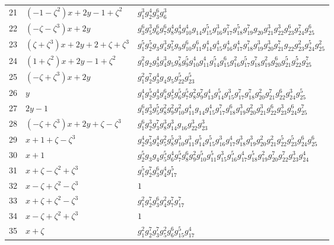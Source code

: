 \documentclass[11pt]{article}
\begin{document}
{\begin{longtable}{@{}rll@{}}
21 & $(-1-\zeta^2)x+2 y-1+\zeta^2$ & $g_{1}^{3}g_{2}^{4}g_{3}^{6}g_{6}^{3}$\\
22 & $(-\zeta-\zeta^3)x+2 y$ & $g_{3}^{6}g_{5}^{3}g_{6}^{6}g_{7}^{6}g_{8}^{4}g_{9}^{4}g_{10}^{4}g_{14}g_{15}^{5}g_{16}^{3}g_{17}^{7}g_{18}^{5}g_{19}^{7}g_{20}g_{21}^{3}g_{22}^{3}g_{23}^{6}g_{24}^{7}g_{25}^{6}$\\
23 & $(\zeta+\zeta^3)x+2 y+2+\zeta+\zeta^3$ & $g_{1}^{5}g_{2}^{5}g_{3}g_{4}^{3}g_{5}^{7}g_{9}g_{10}^{6}g_{11}^{6}g_{14}^{4}g_{15}^{4}g_{16}^{4}g_{17}^{4}g_{18}^{7}g_{19}^{3}g_{20}^{3}g_{21}^{7}g_{22}g_{23}^{2}g_{24}^{5}g_{25}^{2}$\\
24 & $(1+\zeta^2)x+2 y-1+\zeta^2$ & $g_{1}^{2}g_{2}g_{3}^{4}g_{4}^{3}g_{5}g_{8}^{7}g_{9}^{5}g_{10}^{4}g_{11}^{4}g_{14}^{5}g_{15}^{6}g_{16}^{2}g_{17}^{5}g_{18}^{7}g_{19}^{2}g_{20}^{6}g_{21}^{5}g_{22}^{5}g_{25}^{7}$\\
25 & $(-\zeta+\zeta^3)x+2 y$ & $g_{1}^{2}g_{2}^{7}g_{3}^{4}g_{4}g_{5}g_{22}^{5}g_{23}^{5}$\\
26 & $y$ & $g_{1}^{4}g_{2}^{5}g_{3}^{4}g_{4}^{6}g_{5}^{4}g_{6}^{5}g_{7}^{5}g_{8}^{2}g_{9}^{7}g_{13}^{4}g_{14}^{5}g_{15}^{3}g_{17}^{7}g_{18}^{7}g_{20}^{2}g_{21}^{7}g_{22}^{6}g_{24}^{3}g_{25}^{5}$\\
27 & $2 y-1$ & $g_{1}^{6}g_{3}^{3}g_{5}^{5}g_{8}^{2}g_{9}^{2}g_{10}^{2}g_{11}^{4}g_{14}g_{15}^{4}g_{17}^{7}g_{18}^{6}g_{19}^{3}g_{20}^{2}g_{21}^{3}g_{22}^{6}g_{23}^{3}g_{24}^{6}g_{25}^{7}$\\
28 & $(-\zeta+\zeta^3)x+2 y+\zeta-\zeta^3$ & $g_{1}^{6}g_{2}^{3}g_{3}^{7}g_{8}^{3}g_{14}^{3}g_{16}g_{22}^{3}g_{23}^{3}$\\
29 & $x+1+\zeta-\zeta^3$ & $g_{2}^{4}g_{3}^{7}g_{4}^{4}g_{5}^{2}g_{8}^{5}g_{10}^{3}g_{11}^{3}g_{14}^{5}g_{15}^{5}g_{16}^{3}g_{17}^{4}g_{18}^{3}g_{19}^{3}g_{20}^{2}g_{21}^{2}g_{22}^{5}g_{23}^{5}g_{24}^{6}g_{25}^{6}$\\
30 & $x+1$ & $g_{2}^{5}g_{3}g_{4}g_{5}^{5}g_{6}^{4}g_{7}^{5}g_{8}^{6}g_{9}^{2}g_{10}^{5}g_{11}^{5}g_{15}^{3}g_{16}^{5}g_{17}^{4}g_{18}^{5}g_{19}^{2}g_{20}^{7}g_{22}^{7}g_{23}^{3}g_{24}^{4}$\\
31 & $x+\zeta-\zeta^2+\zeta^3$ & $g_{1}^{5}g_{2}^{7}g_{3}^{6}g_{4}^{4}g_{17}^{5}$\\
32 & $x-\zeta+\zeta^2-\zeta^3$ & $1$\\
33 & $x+\zeta+\zeta^2-\zeta^3$ & $g_{1}^{2}g_{2}^{7}g_{3}^{6}g_{4}^{2}g_{7}^{7}g_{17}^{7}$\\
34 & $x-\zeta+\zeta^2+\zeta^3$ & $1$\\
35 & $x+\zeta$ & $g_{1}^{2}g_{2}^{7}g_{3}^{7}g_{5}^{2}g_{6}^{6}g_{15}^{5}g_{17}^{4}$\\

\end{longtable}}
\end{document}
